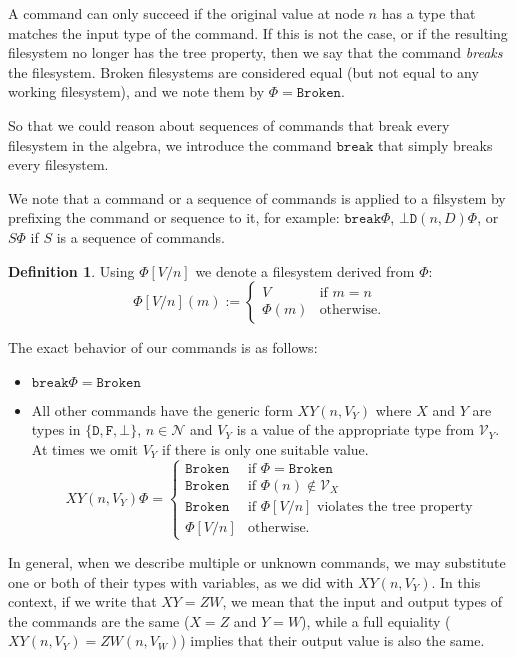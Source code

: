 \documentclass[12pt]{article}
\newcommand{\setvx}[1]{\mathcal{V}_{#1}}
\newcommand{\setn}{\mathcal{N}} %
\newcommand{\empt}{\bot}
\newcommand{\fsbroken}{\mathtt{Broken}} %
\newcommand{\FS}{\Phi} %
\newcommand{\cbrk}{\mathtt{break}} %
\newcommand{\fscommand}[2]{{#1#2}}
\newcommand{\fsregcommandchar}[1]{\mathtt{#1}}
\newcommand{\fsregcommand}[2]{\fscommand{\fsregcommandchar{#1}}{\fsregcommandchar{#2}}}
\newcommand{\cbd}{\fsregcommand{\empt}{D}}
\newcommand{\cxy}{\fscommand{X}{Y}}
\newcommand{\czw}{\fscommand{Z}{W}}
\newcommand{\typeset}{\{\fsregcommandchar{D},\fsregcommandchar{F},\empt\}} %
\theoremstyle{definition}
\newtheorem{mydef}{Definition}
\begin{document}
A command can only succeed if the original value at node $n$ has a type that matches
the input type of the command. If this is not the case, or if the resulting
filesystem no longer has the tree property, then we say that the command
{\em breaks} the filesystem. Broken filesystems are considered equal
(but not equal to any working filesystem), and we note them by $\FS=\fsbroken$.

So that we could reason about sequences of commands that break every filesystem
in the algebra, we introduce the command $\cbrk$ that simply breaks every filesystem.

We note that a command or a sequence of commands is applied to a filsystem
by prefixing the command or sequence to it, for example: $\cbrk\FS$, $\cbd(n,D)\FS$, 
or $S\FS$ if $S$ is a sequence of commands.

\begin{mydef}
Using $\FS[V/n]$ we denote a filesystem derived from $\FS$:
\[ \FS[V/n](m) :=
   \begin{cases}
   V &\mbox{if~} m=n\\
   \FS(m) &\mbox{otherwise.}
   \end{cases}
\]
\end{mydef}

The exact behavior of our commands is as follows:
\begin{itemize}
\item $\cbrk\FS = \fsbroken$
\item
All other commands have the generic form $\cxy(n,V_Y)$ where
$X$ and $Y$ are types in $\typeset$,
$n\in\setn$ and $V_Y$ is a value of the appropriate type from $\setvx{Y}$.
At times we omit $V_Y$ if there is only one suitable value.
\[ \cxy(n,V_Y)\FS = 
   \begin{cases}
   \fsbroken &\mbox{if~} \FS=\fsbroken\\
   \fsbroken &\mbox{if~} \FS(n)\not\in\setvx{X}\\
   \fsbroken &\mbox{if~} \FS[V/n] \mbox{~violates the tree property}\\
   \FS[V/n] &\mbox{otherwise.}
   \end{cases}
\]
\end{itemize}


In general, when we describe multiple or unknown commands, we may substitute one or both
of their types with variables, as we did with $\cxy(n,V_Y)$. In this context,
if we write that $\cxy=\czw$, we mean that the input and output types
of the commands are the same ($X=Z$ and $Y=W$), while a full equiality 
($\cxy(n,V_Y)=\czw(n,V_W)$)
implies
that their output value is also the same.
\end{document}
